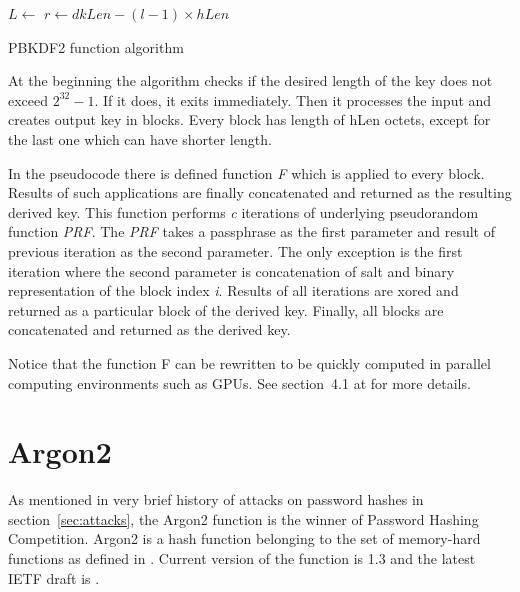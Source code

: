 \documentclass[nolof,digital]{fithesis3}
\begin{document}
\begin{algorithm}
\DontPrintSemicolon
\LinesNumbered
{}
\(L \leftarrow \)  \;
\(r \leftarrow dkLen - (l - 1) \times hLen \)
 \;
\caption{PBKDF2 function algorithm}
\label{pbkdf2alg}
\end{algorithm}

At the beginning the algorithm checks if the desired length of the key does not exceed \(2^{32} - 1\). If it does, it exits immediately. Then it processes the input and creates output key in blocks. Every block has length of hLen octets, except for the last one which can have shorter length. 

In the pseudocode there is defined function \emph{F} which is applied to every block. Results of such applications are finally concatenated and returned as the resulting derived key. This function performs \emph{c} iterations of underlying pseudorandom function \emph{PRF}. The \emph{PRF} takes a passphrase as the first parameter and result of previous iteration as the second parameter. The only exception is the first iteration where the second parameter is concatenation of salt and binary representation of the block index \emph{i}. Results of all iterations are xored and returned as a particular block of the derived key. Finally, all blocks are concatenated and returned as the derived key.

Notice that the function F can be rewritten to be quickly computed in parallel computing environments such as GPUs. See section~4.1 at \parencite{mosnacek} for more details.

\section{Argon2}
\label{argon2}
As mentioned in very brief history of attacks on password hashes in section~\ref{sec:attacks}, the Argon2 function is the winner of Password Hashing Competition. Argon2 is a hash function belonging to the set of memory-hard functions as defined in \parencite{memoryhard}. Current version of the function is 1.3 and the latest IETF draft is \parencite{argon2draft}.
\end{document}
